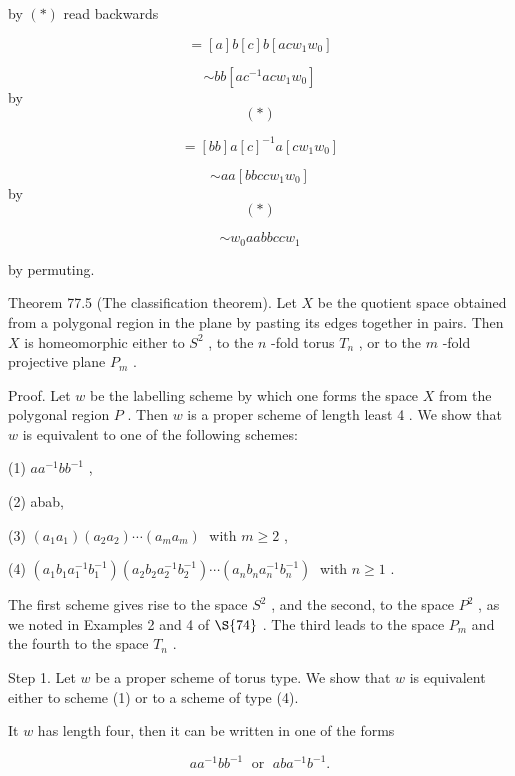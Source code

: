by \(\left( *\right)\) read backwards

\[
= \left\lbrack  a\right\rbrack  b\left\lbrack  c\right\rbrack  b\left\lbrack  {{ac}{w}_{1}{w}_{0}}\right\rbrack
\]

\[
\sim  {bb}\left\lbrack  {a{c}^{-1}{ac}{w}_{1}{w}_{0}}\right\rbrack
\]
 by
\[
\left( *\right)
\]

\[
= \left\lbrack  {bb}\right\rbrack  a{\left\lbrack  c\right\rbrack  }^{-1}a\left\lbrack  {c{w}_{1}{w}_{0}}\right\rbrack
\]

\[
\sim  {aa}\left\lbrack  {{bbcc}{w}_{1}{w}_{0}}\right\rbrack
\]
 by
\[
\left( *\right)
\]

\[
\sim  {w}_{0}{aabbcc}{w}_{1}
\]

by permuting.

Theorem 77.5 (The classification theorem). Let \(X\) be the quotient space obtained from a polygonal region in the plane by pasting its edges together in pairs. Then \(X\) is homeomorphic either to \({S}^{2}\) , to the \(n\) -fold torus \({T}_{n}\) , or to the \(m\) -fold projective plane \({P}_{m}\) .

Proof. Let \(w\) be the labelling scheme by which one forms the space \(X\) from the polygonal region \(P\) . Then \(w\) is a proper scheme of length least 4 . We show that \(w\) is equivalent to one of the following schemes:

(1) \(a{a}^{-1}b{b}^{-1}\) ,

(2) abab,

(3) \(\left( {{a}_{1}{a}_{1}}\right) \left( {{a}_{2}{a}_{2}}\right) \cdots \left( {{a}_{m}{a}_{m}}\right) \;\) with \(m \geq  2\) ,

(4) \(\left( {{a}_{1}{b}_{1}{a}_{1}^{-1}{b}_{1}^{-1}}\right) \left( {{a}_{2}{b}_{2}{a}_{2}^{-1}{b}_{2}^{-1}}\right) \cdots \left( {{a}_{n}{b}_{n}{a}_{n}^{-1}{b}_{n}^{-1}}\right) \;\) with \(n \geq  1\) .

The first scheme gives rise to the space \({S}^{2}\) , and the second, to the space \({P}^{2}\) , as we noted in Examples 2 and 4 of \( \S {74}\) . The third leads to the space \({P}_{m}\) and the fourth to the space \({T}_{n}\) .

Step 1. Let \(w\) be a proper scheme of torus type. We show that \(w\) is equivalent either to scheme (1) or to a scheme of type (4).

It \(w\) has length four, then it can be written in one of the forms

\[
a{a}^{-1}b{b}^{-1}\;\text{ or }\;{ab}{a}^{-1}{b}^{-1}.
\]

